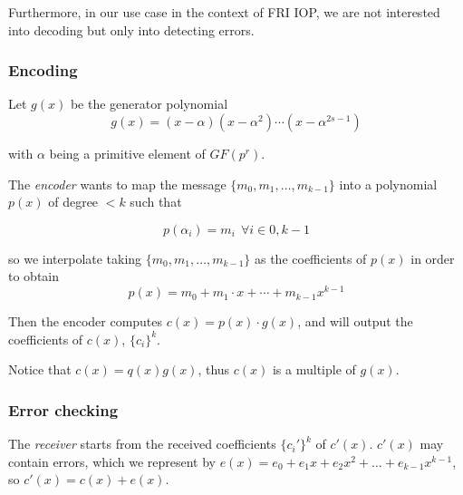 \documentclass[a4paper]{article}
\theoremstyle{definition}
\begin{document}
Furthermore, in our use case in the context of FRI IOP, we are not interested into decoding but only into detecting errors.

% 
% 
% 
% 
% 

% 


\subsubsection{Encoding}

Let $g(x)$ be the generator polynomial
$$g(x) = (x-\alpha) (x-\alpha^2) \cdots (x-\alpha^{2s-1})$$

with $\alpha$ being a primitive element of $GF(p^r)$.

The \emph{encoder} wants to map the message $\{ m_0, m_1, \ldots, m_{k-1} \}$ into a polynomial $p(x)$ of degree $<k$ such that

$$p(\alpha_i) = m_i ~~ \forall i\in{0, k-1}$$

so we interpolate taking $\{ m_0, m_1, \ldots, m_{k-1} \}$ as the coefficients of $p(x)$ in order to obtain
$$p(x) = m_0 + m_1 \cdot x + \cdots + m_{k-1} x^{k-1}$$

Then the encoder computes $c(x) = p(x) \cdot g(x)$, and will output the coefficients of $c(x)$, $\{ c_i \}^k$.

Notice that $c(x)=q(x)g(x)$, thus $c(x)$ is a multiple of $g(x)$.

\subsubsection{Error checking}

The \emph{receiver} starts from the received coefficients $\{c_i'\}^k$ of $c'(x)$. $c'(x)$ may contain errors, which we represent by $e(x) = e_0 + e_1 x + e_2 x^2 + \ldots + e_{k-1} x^{k-1}$, so $c'(x) = c(x) + e(x)$.
\end{document}
